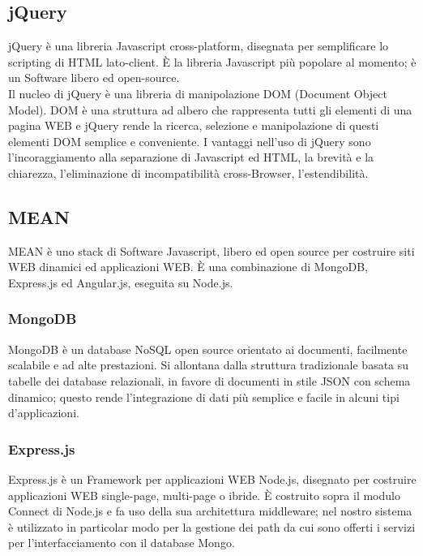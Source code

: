 	\subsection{jQuery}{
		jQuery è una libreria Javascript cross-platform, disegnata per semplificare lo scripting di HTML lato-client. È la libreria Javascript più popolare al momento; è un Software libero ed open-source. \\
		Il nucleo di jQuery è una libreria di manipolazione DOM (Document Object Model). DOM è una struttura ad albero che rappresenta tutti gli elementi di una pagina WEB e jQuery rende la ricerca, selezione e manipolazione di questi elementi DOM semplice e conveniente.
		I vantaggi nell'uso di jQuery sono l'incoraggiamento alla separazione di Javascript ed HTML, la brevità e la chiarezza, l'eliminazione di incompatibilità cross-Browser, l'estendibilità.
	}
	\subsection{MEAN}{
		MEAN è uno stack di Software Javascript, libero ed open source per costruire siti WEB dinamici ed applicazioni WEB. È una combinazione di MongoDB, Express.js ed Angular.js, eseguita su Node.js.
	}
	\subsubsection{MongoDB}{
		MongoDB è un database NoSQL open source orientato ai documenti, facilmente scalabile e ad alte prestazioni. Si allontana dalla struttura tradizionale basata su tabelle dei database relazionali, in favore di documenti in stile JSON con schema dinamico; questo rende l'integrazione di dati più semplice e facile in alcuni tipi d'applicazioni.
	}
	\subsubsection{Express.js}{
		Express.js è un Framework per applicazioni WEB Node.js, disegnato per costruire applicazioni WEB single-page, multi-page o ibride.
		È costruito sopra il modulo Connect di Node.js e fa uso della sua architettura middleware; nel nostro sistema è utilizzato in particolar modo per la gestione dei path da cui sono  offerti i servizi per l'interfacciamento con il database Mongo.
	}
